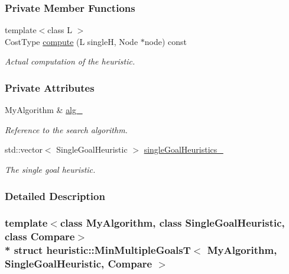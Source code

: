 \subsubsection*{Private Member Functions}
\begin{DoxyCompactItemize}
\item 
{\footnotesize template$<$class L $>$ }\\Cost\+Type \hyperlink{structheuristic_1_1MinMultipleGoalsT_a3129d32f85c230b1247a4da956dc1737}{compute} (L singleH, Node $\ast$node) const 
\begin{DoxyCompactList}\small\item\em Actual computation of the heuristic. \end{DoxyCompactList}\end{DoxyCompactItemize}
\subsubsection*{Private Attributes}
\begin{DoxyCompactItemize}
\item 
My\+Algorithm \& \hyperlink{structheuristic_1_1MinMultipleGoalsT_a6c8d8f5ac17e3f1b28e9b98c5a30d1b3}{alg\+\_\+}\hypertarget{structheuristic_1_1MinMultipleGoalsT_a6c8d8f5ac17e3f1b28e9b98c5a30d1b3}{}\label{structheuristic_1_1MinMultipleGoalsT_a6c8d8f5ac17e3f1b28e9b98c5a30d1b3}

\begin{DoxyCompactList}\small\item\em Reference to the search algorithm. \end{DoxyCompactList}\item 
std\+::vector$<$ Single\+Goal\+Heuristic $>$ \hyperlink{structheuristic_1_1MinMultipleGoalsT_af3d79d4c4a4ebee5ad1021f5ca9bcc89}{single\+Goal\+Heuristics\+\_\+}\hypertarget{structheuristic_1_1MinMultipleGoalsT_af3d79d4c4a4ebee5ad1021f5ca9bcc89}{}\label{structheuristic_1_1MinMultipleGoalsT_af3d79d4c4a4ebee5ad1021f5ca9bcc89}

\begin{DoxyCompactList}\small\item\em The single goal heuristic. \end{DoxyCompactList}\end{DoxyCompactItemize}


\subsubsection{Detailed Description}
\subsubsection*{template$<$class My\+Algorithm, class Single\+Goal\+Heuristic, class Compare$>$\\*
struct heuristic\+::\+Min\+Multiple\+Goals\+T$<$ My\+Algorithm, Single\+Goal\+Heuristic, Compare $>$}

